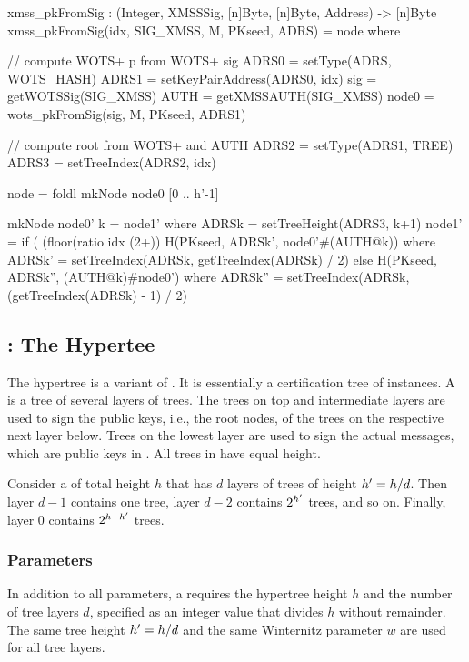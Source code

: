 \begin{code}
  xmss_pkFromSig : (Integer, XMSSSig, [n]Byte, [n]Byte, Address) -> [n]Byte
  xmss_pkFromSig(idx, SIG_XMSS, M, PKseed, ADRS) = node where 

    // compute WOTS+ p from WOTS+ sig
    ADRS0 = setType(ADRS, WOTS_HASH)
    ADRS1 = setKeyPairAddress(ADRS0, idx)
    sig = getWOTSSig(SIG_XMSS)
    AUTH = getXMSSAUTH(SIG_XMSS)
    node0 = wots_pkFromSig(sig, M, PKseed, ADRS1)

    // compute root from WOTS+ and AUTH
    ADRS2 = setType(ADRS1, TREE)
    ADRS3 = setTreeIndex(ADRS2, idx)

    node = foldl mkNode node0 [0 .. h'-1]

    mkNode node0' k = node1' where
      ADRSk = setTreeHeight(ADRS3, k+1)
      node1' =
        if ( (floor(ratio idx (2^^k)) %
          H(PKseed, ADRSk', node0'#(AUTH@k)) where
            ADRSk' = setTreeIndex(ADRSk, getTreeIndex(ADRSk) / 2)
        else
          H(PKseed, ADRSk'', (AUTH@k)#node0') where
            ADRSk'' = setTreeIndex(ADRSk, (getTreeIndex(ADRSk) - 1) / 2)
\end{code}

\subsection{\hyper: The Hypertee} \label{sec:hyper}

   The \spx hypertree \hyper is a variant of \xmssm. It is essentially a 
   certification tree of \xmss instances. A \hyper is
   a tree of several layers of \xmss trees.  The
   trees on top and intermediate layers are used to sign the public keys, i.e., 
   the root nodes, of the \xmss trees on the respective next layer below. 
   Trees on the lowest layer are used to sign the actual messages, which are
   \fors public keys in \spx. All \xmss trees in \hyper have
   equal height.

   Consider a \hyper of total height $h$ that has $d$ layers of \xmss
   trees of height ${h'} = h / d$.  Then layer $d - 1$ contains one \xmss tree,
   layer $d - 2$ contains $2^{{h'}}$ \xmss trees, and so on.  Finally, layer
   0 contains $2^{h - {h'}}$ \xmss trees.

\subsubsection{\hyper Parameters}\label{sec:ht:params}

   In addition to all \xmss parameters, a \hyper requires the hypertree height 
   $h$ and the
   number of tree layers $d$, specified as an integer value that divides $h$
   without remainder.  The same tree height ${h'} = h / d$ and the same
   Winternitz parameter $w$ are used for all tree layers.

